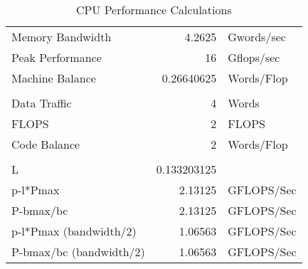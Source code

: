\begin{table}[htbp]
	\centering
	\caption{CPU Performance Calculations}
	\begin{tabular}{lrl}
		Memory Bandwidth        & 4.2625      & Gwords/sec \\
		Peak Performance        & 16          & Gflops/sec \\
		Machine Balance         & 0.26640625  & Words/Flop \\
		                        &             &            \\
		Data Traffic            & 4           & Words      \\
		FLOPS                   & 2           & FLOPS      \\
		Code Balance            & 2           & Words/Flop \\
		                        &             &            \\
		L                       & 0.133203125 &            \\
		p-l*Pmax                & 2.13125     & GFLOPS/Sec \\
		P-bmax/bc               & 2.13125     & GFLOPS/Sec \\
		p-l*Pmax (bandwidth/2)  & 1.06563     & GFLOPS/Sec \\
		P-bmax/bc (bandwidth/2) & 1.06563     & GFLOPS/Sec \\
						    
	\end{tabular}%
	\label{tab:addlabel}%
\end{table}%